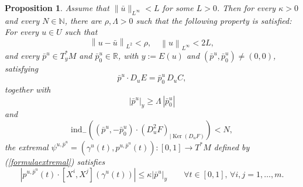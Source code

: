 \documentclass[JEP,XML,SOM,Unicode,NoFloatCountersInSection,published]{cedram}
\DeclareMathOperator{\Ker}{Ker}
\newcommand\R{\mathbb R}
\newcommand\N{\mathbb N}
\newtheorem{proposition}[theorem]{Proposition}
\theoremstyle{definition}
\begin{document}
\begin{proposition}\label{PROPGohNormal}
Assume that $\|\bar{u}\|_{L^{\infty}}<L$ for some $L>0$. Then for every $\kappa>0$ and every $N\in \N$, there are $\rho, \Lambda>0$ such that the following property is satisfied: For every $u\in U$ such that
\begin{equation}\label{HypGohNormal1}
\left\|u-\bar{u}\right\|_{L^2}< \rho, \quad \left\|u\right\|_{L^{\infty}}< 2L,
\end{equation}
and every $\bar{p}^u \in T_y^*M$ and $\bar{p}_0^u \in \R$, with $y:=E(u)$ and $(\bar{p}^u,\bar{p}_0^u) \neq (0,0)$, satisfying
\begin{equation}\label{Lagrange2}
\bar{p}^u \cdot D_{u} E = \bar{p}_0^u \, D_{u} C,
\end{equation}
together with
\begin{equation}\label{HypGohNormal2}
\left| \bar{p}^u\right|_y \geq \Lambda \, \left| \bar{p}_0^{u}\right|
\end{equation}
and
\begin{equation}\label{HypGohNormal3}
\mathrm{ind}_- \left(\left(\bar{p}^u,-\bar{p}_0^u\right) \cdot \left(D^2_{u} F \right)_{\vert \Ker (D_{u}F)} \right) < N,
\end{equation}
the extremal $\psi^{u,\bar{p}^u} = (\gamma^u(t),p^{u,\bar{p}^u}(t)): [0,1] \to T^*M$ defined by (\ref{formulaextremal}) satisfies
\begin{equation}\label{AlmostGoh}
\left| p^{u,\bar{p}^u}(t) \cdot \left[ X^i,X^j\right] \left(\gamma^u(t)\right)\right| \leq \kappa \left| \bar{p}^u\right|_y \qquad \forall t \in [0,1], \, \forall i,j = 1, \ldots, m.
\end{equation}
\end{proposition}
\end{document}
